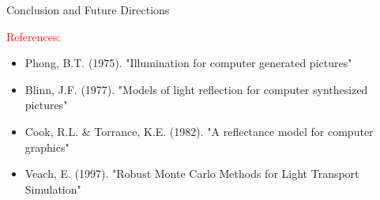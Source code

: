 \documentclass[aspectratio=169]{beamer}
\begin{document}
\begin{frame}{Conclusion and Future Directions}
    \vspace{0.5cm}
    \begin{center}
        \textcolor{red}{\large References:}
        \begin{itemize}
            \item Phong, B.T. (1975). "Illumination for computer generated pictures"
            \item Blinn, J.F. (1977). "Models of light reflection for computer synthesized pictures"
            \item Cook, R.L. \& Torrance, K.E. (1982). "A reflectance model for computer graphics"
            \item Veach, E. (1997). "Robust Monte Carlo Methods for Light Transport Simulation"
        \end{itemize}
    \end{center}
\end{frame}
\end{document}
